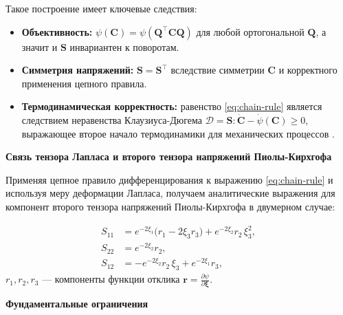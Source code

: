 Такое построение имеет ключевые следствия:
\begin{itemize}
  \item \textbf{Объективность:} $\psi(\mathbf{C})=\psi(\mathbf{Q}^\top\mathbf{C}\mathbf{Q})$ для любой ортогональной $\mathbf{Q}$, а значит и $\mathbf{S}$ инвариантен к поворотам.
  \item \textbf{Симметрия напряжений:} $\mathbf{S}=\mathbf{S}^\top$ вследствие симметрии $\mathbf{C}$ и корректного применения цепного правила.
  \item \textbf{Термодинамическая корректность:} равенство \eqref{eq:chain-rule} является следствием неравенства Клаузиуса-Дюгема 
  $\mathcal{D} = \mathbf{S} : \dot{\mathbf{C}} - \dot{\psi}(\mathbf{C}) \geq 0$, 
  выражающее второе начало термодинамики для механических процессов \cite{truesdell1984historical,truesdell2004nonlinear}.
\end{itemize}

\textbf{Связь тензора Лапласа и второго тензора напряжений Пиолы-Кирхгофа}

Применяя цепное правило дифференцирования к выражению \eqref{eq:chain-rule} и используя меру деформации Лапласа, 
получаем аналитические выражения для компонент второго тензора напряжений Пиолы-Кирхгофа в двумерном случае:

\begin{equation}
\begin{aligned}
  S_{11} &= e^{-2\xi_1}\big(r_1-2\xi_3 r_3\big) + e^{-2\xi_2} r_2\,\xi_3^2,\\
  S_{22} &= e^{-2\xi_2} r_2,\\
  S_{12} &= -e^{-2\xi_2} r_2\,\xi_3 + e^{-2\xi_1} r_3,
\end{aligned}
\label{eq:stress_components_2d}
\end{equation}
$r_1, r_2, r_3$ — компоненты функции отклика $\mathbf{r} = \frac{\partial \psi}{\partial \boldsymbol\xi}$.


\textbf{Фундаментальные ограничения}

